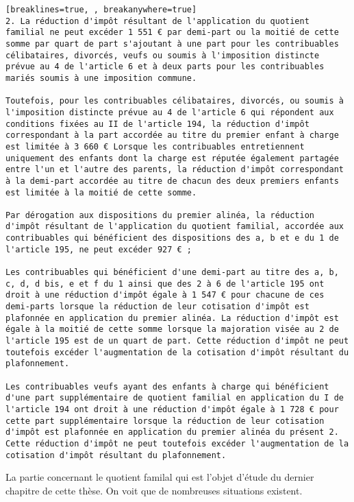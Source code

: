 \begin{Verbatim}[breaklines=true, , breakanywhere=true]
2. La réduction d'impôt résultant de l'application du quotient familial ne peut excéder 1 551 € par demi-part ou la moitié de cette somme par quart de part s'ajoutant à une part pour les contribuables célibataires, divorcés, veufs ou soumis à l'imposition distincte prévue au 4 de l'article 6 et à deux parts pour les contribuables mariés soumis à une imposition commune.

Toutefois, pour les contribuables célibataires, divorcés, ou soumis à l'imposition distincte prévue au 4 de l'article 6 qui répondent aux conditions fixées au II de l'article 194, la réduction d'impôt correspondant à la part accordée au titre du premier enfant à charge est limitée à 3 660 € Lorsque les contribuables entretiennent uniquement des enfants dont la charge est réputée également partagée entre l'un et l'autre des parents, la réduction d'impôt correspondant à la demi-part accordée au titre de chacun des deux premiers enfants est limitée à la moitié de cette somme.

Par dérogation aux dispositions du premier alinéa, la réduction d'impôt résultant de l'application du quotient familial, accordée aux contribuables qui bénéficient des dispositions des a, b et e du 1 de l'article 195, ne peut excéder 927 € ;

Les contribuables qui bénéficient d'une demi-part au titre des a, b, c, d, d bis, e et f du 1 ainsi que des 2 à 6 de l'article 195 ont droit à une réduction d'impôt égale à 1 547 € pour chacune de ces demi-parts lorsque la réduction de leur cotisation d'impôt est plafonnée en application du premier alinéa. La réduction d'impôt est égale à la moitié de cette somme lorsque la majoration visée au 2 de l'article 195 est de un quart de part. Cette réduction d'impôt ne peut toutefois excéder l'augmentation de la cotisation d'impôt résultant du plafonnement.

Les contribuables veufs ayant des enfants à charge qui bénéficient d'une part supplémentaire de quotient familial en application du I de l'article 194 ont droit à une réduction d'impôt égale à 1 728 € pour cette part supplémentaire lorsque la réduction de leur cotisation d'impôt est plafonnée en application du premier alinéa du présent 2. Cette réduction d'impôt ne peut toutefois excéder l'augmentation de la cotisation d'impôt résultant du plafonnement.
\end{Verbatim}

La partie concernant le quotient familal qui est l'objet d'étude du
dernier chapitre de cette thèse. On voit que de nombreuses situations
existent.

